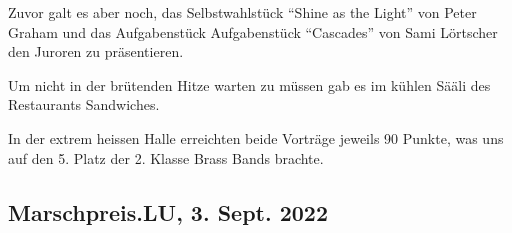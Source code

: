 \begin{history}
    Zuvor galt es aber noch, das Selbstwahlstück \enquote{Shine as the Light}
    von Peter Graham und das Aufgabenstück Aufgabenstück \enquote{Cascades} von
    Sami Lörtscher den Juroren zu präsentieren.

    Um nicht in der brütenden Hitze warten zu müssen gab es im kühlen Sääli des
    Restaurants Sandwiches.

    In der extrem heissen Halle erreichten beide Vorträge jeweils 90 Punkte, was
    uns auf den 5. Platz der 2. Klasse Brass Bands brachte.

\end{history}

\subsection*{Marschpreis.LU, 3. Sept. 2022}

